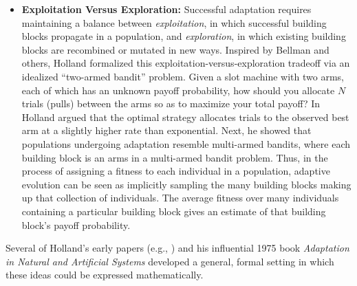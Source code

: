 \documentclass{sig-alternate}
\begin{document}
\begin{itemize}

\item{\bf Exploitation Versus Exploration:} Successful adaptation
  requires maintaining a balance between \emph{exploitation}, in which
 successful building blocks propagate in a population, and \emph{
    exploration}, in which existing building blocks are recombined or
  mutated in new ways.  Inspired by Bellman \cite{Bellman1961} and
others, Holland formalized this exploitation-versus-exploration tradeoff
via an idealized ``two-armed bandit'' problem.  Given a slot machine
with two arms, each of which has an unknown payoff probability, how
should you allocate $N$ trials (pulls) between the arms so as to
maximize your total payoff?   In \cite{Holland1973,Holland1975}
Holland 
argued that the optimal strategy
allocates trials to the observed best arm at a slightly higher rate than
exponential.
Next, he showed that 
populations undergoing adaptation resemble multi-armed bandits, where
each building block is an 
arms in a multi-armed bandit problem.
Thus, in the process of assigning a fitness to each individual in a
population, adaptive evolution can be seen as implicitly sampling the
many building blocks making up that collection of individuals.  The
average fitness over many individuals containing a particular building
block gives an estimate of that building block's payoff probability.

\end{itemize}

Several of Holland's early papers (e.g.,
\cite{Holland1962,Holland1973}) and his influential
1975 book \emph{Adaptation in Natural and Artificial Systems}
\cite{Holland1975} developed a general, formal setting in which these ideas
could be expressed mathematically.
\end{document}
